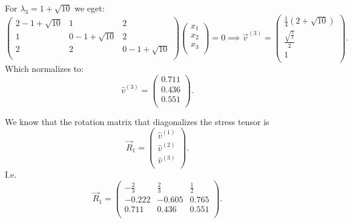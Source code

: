 \begin{derivation}
   For $\lambda_3 = 1 + \sqrt{10}$ we eget:
   \begin{equation*}
     \begin{pmatrix}
       2 - 1 + \sqrt{10} & 1 & 2\\
     1 & 0 - 1 + \sqrt{10} & 2\\
     2 & 2 & 0 - 1 + \sqrt{10}\\
     \end{pmatrix} \begin{pmatrix}
       x_1\\
     x_2\\
     x_3\\
     \end{pmatrix} = 0 \implies \Vec{v}^{(3)} = \begin{pmatrix}
       \frac{1}{4} (2 + \sqrt{10})\\
     \frac{\sqrt{\frac{5}{2}}}{2}\\
     1\\
     \end{pmatrix}
   .\end{equation*}
   Which normalizes to:
   \begin{equation*}
     \hat{v}^{(3)} = \begin{pmatrix}
       \num{0,711} \\
     \num{0,436} \\
     \num{0,551} \\
     \end{pmatrix}
   .\end{equation*}
   
   We know that the rotation matrix that diagonalizes the stress tensor is
   \begin{equation*}
     \Vec{R}_1 = \begin{pmatrix}
       \hat{v}^{(1)} \\ \hat{v}^{(2)} \\ \hat{v}^{(3)}\\
     \end{pmatrix}
   .\end{equation*}
   I.e.
   \begin{equation*}
     \Vec{R}_1 = \begin{pmatrix}
       - \frac{2}{3} & \frac{2}{3} & \frac{1}{2}\\
     \num{-0,222}  & \num{-0,605}  & \num{0,765} \\
     \num{0,711}  & \num{0,436}  & \num{0,551} \\
     \end{pmatrix}
   .\end{equation*}
   

\end{derivation}
